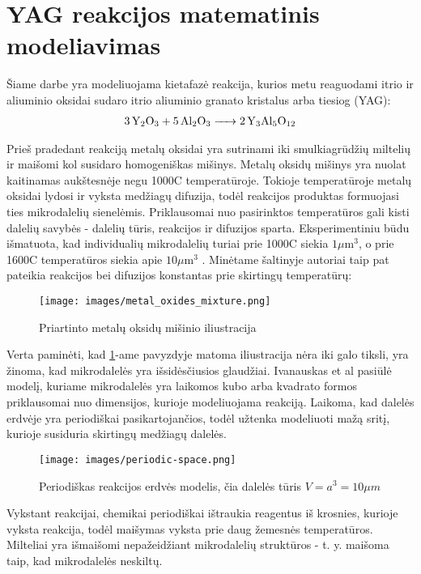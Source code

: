 \section{YAG reakcijos matematinis modeliavimas}

Šiame darbe yra modeliuojama kietafazė reakcija, kurios metu reaguodami itrio ir aliuminio oksidai sudaro itrio aliuminio granato kristalus arba tiesiog (YAG):
\begin{align*}
  \ce{3Y_2O_3 + 5Al_2O_3 -> 2Y_3Al_5O_12}
\end{align*}

Prieš pradedant reakciją metalų oksidai yra sutrinami iki smulkiagrūdžių miltelių ir maišomi kol susidaro homogeniškas mišinys. Metalų oksidų mišinys yra nuolat kaitinamas aukštesnėje negu 1000\degree C temperatūroje. Tokioje temperatūroje metalų oksidai lydosi ir vyksta medžiagų difuzija, todėl reakcijos produktas formuojasi ties mikrodalelių sienelėmis. Priklausomai nuo pasirinktos temperatūros gali kisti dalelių savybės - dalelių tūris, reakcijos ir difuzijos sparta. Eksperimentiniu būdu išmatuota, kad individualių mikrodalelių turiai prie 1000\degree C siekia $1\mu \text{m}^3$, o prie 1600\degree C temperatūros siekia apie $10\mu\text{m}^3$ \cite{ivanauskasComputationalModellingYAG2009}. Minėtame šaltinyje autoriai taip pat pateikia reakcijos bei difuzijos konstantas prie skirtingų temperatūrų:




\begin{figure}[h]
  \centering
  \texttt{[image: images/metal\_oxides\_mixture.png]}
  \caption{Priartinto metalų oksidų mišinio iliustracija \cite{ivanauskasComputationalModellingYAG2009}}
  \label{fig:metal-oxides-mixuter}
\end{figure}

Verta paminėti, kad \ref{fig:metal-oxides-mixuter}-ame pavyzdyje matoma iliustracija nėra iki galo tiksli, yra žinoma, kad mikrodalelės yra išsidėsčiusios glaudžiai.
\cite{ivanauskasModellingSolidState2005} Ivanauskas et al pasiūlė modelį, kuriame mikrodalelės yra laikomos kubo arba kvadrato formos priklausomai nuo dimensijos, kurioje modeliuojama reakciją. Laikoma, kad dalelės erdvėje yra periodiškai pasikartojančios, todėl užtenka modeliuoti mažą sritį, kurioje susiduria skirtingų medžiagų dalelės. 

\begin{figure}[h]
  \centering
  \texttt{[image: images/periodic-space.png]}
  \caption{Periodiškas reakcijos erdvės modelis, čia dalelės tūris $V=a^3=10\mu m$ \cite{ivanauskasComputationalModellingYAG2009}}
  \label{fig:periodic-space}
\end{figure}

Vykstant reakcijai, chemikai periodiškai ištraukia reagentus iš krosnies, kurioje vyksta reakcija, todėl maišymas vyksta prie daug žemesnės temperatūros. Milteliai yra išmaišomi nepažeidžiant mikrodalelių struktūros - t. y. maišoma taip, kad mikrodalelės neskiltų.